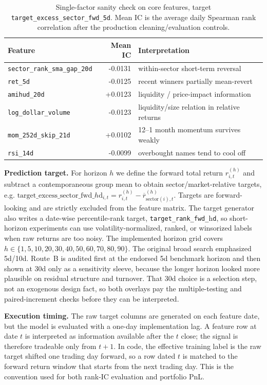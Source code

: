 \documentclass[9pt]{extarticle}
\begin{document}
\begin{table}[t]
  \centering
  \caption{Single-factor sanity check on core features, target
  \texttt{target\_excess\_sector\_fwd\_5d}. Mean IC is the average daily
  Spearman rank correlation after the production cleaning/evaluation controls.}
  \label{tab:feature_sanity}
  \small
  \begin{tabular}{lrl}
    \toprule
    Feature & Mean IC & Interpretation \\
    \midrule
    \texttt{sector\_rank\_sma\_gap\_20d} & -0.0131 & within-sector short-term reversal \\
    \texttt{ret\_5d} & -0.0125 & recent winners partially mean-revert \\
    \texttt{amihud\_20d} & +0.0123 & liquidity / price-impact information \\
    \texttt{log\_dollar\_volume} & -0.0123 & liquidity/size relation in relative returns \\
    \texttt{mom\_252d\_skip\_21d} & +0.0102 & 12--1 month momentum survives weakly \\
    \texttt{rsi\_14d} & -0.0099 & overbought names tend to cool off \\
    \bottomrule
  \end{tabular}
\end{table}

\textbf{Prediction target.} For horizon $h$ we define the forward total return
$r^{(h)}_{i,t}$ and subtract a contemporaneous group mean to obtain
sector/market-relative targets, e.g.
$\text{target\_excess\_sector\_fwd\_}h\text{d}_{i,t} = r^{(h)}_{i,t} -
\overline{r}^{(h)}_{\text{sector}(i),t}$. Targets are forward-looking and are
strictly excluded from the feature matrix. The target generator also writes a
date-wise percentile-rank target, \texttt{target\_rank\_fwd\_}h\texttt{d}, so
short-horizon experiments can use volatility-normalized, ranked, or winsorized
labels when raw returns are too noisy. The implemented horizon grid covers
$h\in\{1,5,10,20,30,40,50,60,70,80,90\}$. The original broad search emphasized
5d/10d. Route~B is audited first at the endorsed 5d benchmark horizon and then
shown at 30d only as a sensitivity sleeve, because the longer horizon looked
more plausible on residual structure and turnover. That 30d choice is a
selection step, not an exogenous design fact, so both overlays pay the
multiple-testing and paired-increment checks before they can be interpreted.

\textbf{Execution timing.} The raw target columns are generated on each feature
date, but the model is evaluated with a one-day implementation lag. A feature row
at date $t$ is interpreted as information available after the $t$ close; the
signal is therefore tradeable only from $t{+}1$. In code, the effective training
label is the raw target shifted one trading day forward, so a row dated $t$ is
matched to the forward return window that starts from the next trading day. This
is the convention used for both rank-IC evaluation and portfolio PnL.
\end{document}
